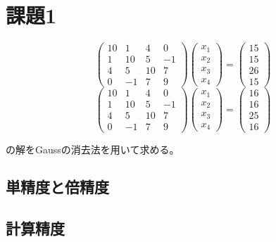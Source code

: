 \documentclass{jsarticle}
\begin{document}
\section{課題1}
\begin{equation}
  \left(
  \begin{array}{rrrr}
      10 & 1 & 4& 0\\
      1 & 10 & 5 & -1\\
      4 & 5 & 10 & 7\\
      0 & -1 & 7 & 9 
  \end{array}
  \right)
  \left(
  \begin{array}{r}
      x_1\\
      x_2\\
      x_3\\
      x_4 
  \end{array}
  \right)
  =
  \left(
  \begin{array}{r}
      15\\
      15\\
      26\\
      15
  \end{array}
  \right)
\end{equation}
\begin{equation}
  \left(
  \begin{array}{rrrr}
      10 & 1 & 4& 0\\
      1 & 10 & 5 & -1\\
      4 & 5 & 10 & 7\\
      0 & -1 & 7 & 9 
  \end{array}
  \right)
  \left(
  \begin{array}{r}
      x_1\\
      x_2\\
      x_3\\
      x_4 
  \end{array}
  \right)
  =
  \left(
  \begin{array}{r}
      16\\
      16\\
      25\\
      16
  \end{array}
  \right)
\end{equation}

の解をGaussの消去法を用いて求める。
\subsection{単精度と倍精度}
\subsection{計算精度}
\end{document}
